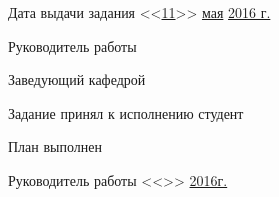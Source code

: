 {	\vspace{1cm}

	Дата выдачи задания <<\uline{\phantom{N}11\phantom{N}}>> \uline{\phantom{N}мая\phantom{N}} \uline{\phantom{N}2016 г.\phantom{N}}

	\vspace{0.5cm}
	Руководитель работы \hspace{3.5cm}  

	\vspace{0.5cm}
	Заведующий кафедрой \hspace{3.5cm}  

	\vspace{0.5cm}
	Задание принял к исполнению студент  

	\vspace{0.5cm}
	План выполнен \uline{\hfill}

	\hspace{0.5\textwidth}{\footnotesize(полностью, не полностью)}

	\vspace{0.5cm}
	Руководитель работы  <<\uline{\phantom{11}}>> \uline{\phantom{1qмая}} \uline{2016г.}  
\clearpage
\restoregeometry
}